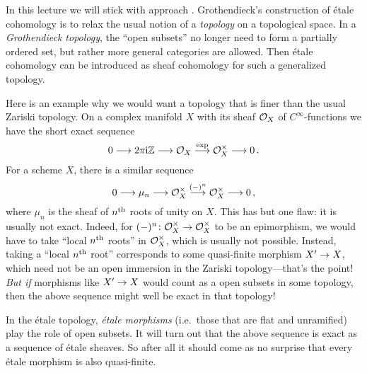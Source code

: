In this lecture we will stick with approach . Grothendieck's construction of étale cohomology is to relax the usual notion of a \emph{topology} on a topological space. In a \emph{Grothendieck topology}, the \enquote{open subsets} no longer need to form a partially ordered set, but rather more general categories are allowed. Then étale cohomology can be introduced as sheaf cohomology for such a generalized topology.

\begin{exm}
	Here is an example why we would want a topology that is finer than the usual Zariski topology. On a complex manifold $X$ with its sheaf $\mathcal{O}_X$ of $C^\infty$-functions we have the short exact sequence
	\begin{equation*}
		0\morphism 2\pi\mathrm{i}\IZ\morphism\Oo_X\morphism[\exp]\Oo_X^\times\morphism 0\,.
	\end{equation*}
	For a scheme $X$, there is a similar sequence
	\begin{equation*}
		0\morphism\mu_n\morphism\Oo_X^\times\morphism[(-)^n]\Oo_X^\times\morphism 0\,,
	\end{equation*}
	where $\mu_n$ is the sheaf of $n^{\text{th}}$ roots of unity on $X$. This has but one flaw: it is usually not exact. Indeed, for $(-)^n\colon \Oo_X^\times\morphism\Oo_X^\times$ to be an epimorphism, we would have to take \enquote{local $n^{\text{th}}$ roots} in $\mathcal{O}_X^\times$, which is usually not possible. Instead, taking a \enquote{local $n^{\text{th}}$ root} corresponds to some quasi-finite morphism $X'\morphism X$, which need not be an open immersion in the Zariski topology---that's the point! \emph{But if} morphisms like $X'\morphism X$ would count as a open subsets in some topology, then the above sequence might well be exact in that topology!
	
	In the étale topology, \emph{étale morphisms} (i.e.\ those that are flat and unramified) play the role of open subsets. It will turn out that the above sequence is exact as a sequence of étale sheaves. So after all it should come as no surprise that every étale morphism is also quasi-finite.
\end{exm}


